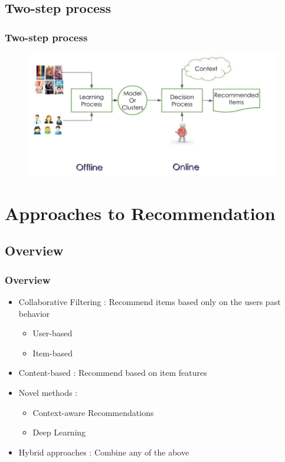 \documentclass[10pt,handout,english]{beamer}
\begin{document}
		\subsection{Two-step process}
			\begin{frame}
			\frametitle{Two-step process}
				\begin{figure}[h!]
	            	\centering
	                \includegraphics[width=\textwidth]{two_step_process.jpg}
		        \end{figure}

			\end{frame}

	\section{Approaches to Recommendation}
		\subsection{Overview}
			\begin{frame}
			\frametitle{Overview}
				\begin{itemize}
					\item Collaborative Filtering : Recommend items based only on the users past behavior
						\begin{itemize}
							\item User-based
							\item Item-based
						\end{itemize}
					\item Content-based : Recommend based on item features
					\item Novel methods :
						\begin{itemize}
							\item Context-aware Recommendations
							\item Deep Learning
						\end{itemize}
					\item Hybrid approaches : Combine any of the above
				\end{itemize}

		\end{frame}
\end{document}

